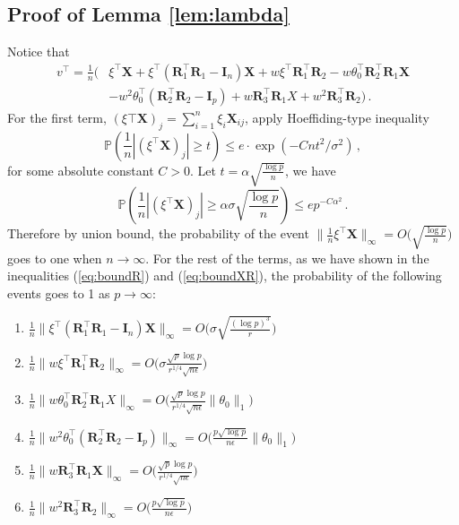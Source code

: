 \documentclass[11pt]{article}
\newcommand{\bX}{\boldsymbol{X}}
\newcommand{\bI}{\boldsymbol{I}}
\newcommand{\bR}{\boldsymbol{R}}
\newcommand{\Prob}{\mathbb{P}}
\begin{document}
\subsection{Proof of Lemma \ref{lem:lambda}}\label{pf:lambda}

    Notice that
    \begin{align*}
        v^\top = \frac{1}{n}\big(&\xi^\top \bX+\xi^\top (\bR_1^\top \bR_1-\bI_n)\bX+w\xi^\top \bR_1^\top \bR_2 - w\theta_0^\top \bR_2^\top \bR_1\bX \\
            &-w^2\theta_0^\top (\bR_2^\top \bR_2-\bI_p)+w\bR_3^\top \bR_1X+w^2\bR_3^\top \bR_2\big)\,.
    \end{align*}
    For the first term, $(\xi\top \bX)_j = \sum_{i=1}^n \xi_i \bX_{ij}$, apply Hoeffiding-type inequality
    \[        \Prob(\frac{1}{n}|(\xi^\top \bX)_j|\geq t)\leq e\cdot \exp(-Cnt^2/\sigma^2)\,,
\]
    for some absolute constant $C>0$. Let $t=\alpha \sqrt{\frac{\log p}{n}}$, we have 
    \begin{equation*}
        \Prob\left(\frac{1}{n}|(\xi^\top \bX)_j|\geq \alpha\sigma \sqrt{\frac{\log p}{n}}\right)\le ep^{-C\alpha^2}\,.
    \end{equation*}
    Therefore by union bound, the probability of the event $\|\frac{1}{n}\xi^\top \bX\|_\infty=O\bigg(\sqrt{\frac{\log p}{n}}\bigg)$ goes to one when $n\to\infty$.
    For the rest of the terms, as we have shown in the inequalities (\ref{eq:boundR}) and (\ref{eq:boundXR}), the probability of the following events goes to 1 as $p\to \infty$:
    \begin{enumerate}
        \item $\frac{1}{n}\|\xi^\top (\bR_1^\top \bR_1-\bI_n)\bX\|_\infty=O\bigg(\sigma\sqrt{\frac{(\log p )^3}{r}} \bigg)$
        \item $\frac{1}{n}\|w\xi^\top \bR_1^\top \bR_2\|_\infty=O\bigg(\sigma \frac{\sqrt{p}\log p}{r^{1/4}\sqrt{n\epsilon}}\bigg)$
        \item $\frac{1}{n}\|w\theta_0^\top \bR_2^\top \bR_1X\|_\infty=O\bigg(\frac{\sqrt{p}\log p}{r^{1/4}\sqrt{n\epsilon}}\|\theta_0\|_1 \bigg)$
        \item $\frac{1}{n}\|w^2\theta_0^\top (\bR_2^\top \bR_2-\bI_p)\|_\infty=O\bigg( \frac{p\sqrt{\log p}}{n\epsilon}\|\theta_0\|_1\bigg)$
        \item $\frac{1}{n}\|w\bR_3^\top \bR_1\bX\|_\infty=O\bigg(\frac{\sqrt{p}\log p}{r^{1/4}\sqrt{n\epsilon}} \bigg)$
        \item $\frac{1}{n}\|w^2\bR_3^\top \bR_2\|_\infty=O\bigg(\frac{p\sqrt{\log p}}{n\epsilon} \bigg)$
    \end{enumerate}
\end{document}
